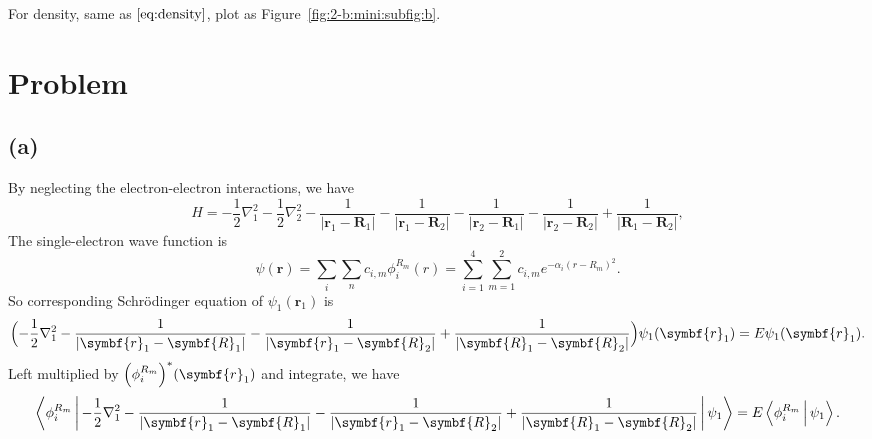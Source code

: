 
For density, same as $\eqref{eq:density}$, plot as Figure~\ref{fig:2-b:mini:subfig:b}.

\section{Problem }

\subsection*{(a)}

By neglecting the electron-electron interactions, we have
%
\begin{equation}
    H = -\frac{1}{2}\nabla_1^2 - \frac{1}{2}\nabla_2^2
    - \frac{1}{\lvert \symbf{r}_1 - \symbf{R}_1 \rvert} - \frac{1}{\lvert \symbf{r}_1 - \symbf{R}_2 \rvert}
    - \frac{1}{\lvert \symbf{r}_2 - \symbf{R}_1 \rvert} - \frac{1}{\lvert \symbf{r}_2 - \symbf{R}_2 \rvert}
    + \frac{1}{\lvert \symbf{R}_1 - \symbf{R}_2 \rvert},
\end{equation}
%
The single-electron wave function is
%
\begin{equation}
    \psi(\symbf{r}) = \sum_{i} \sum_n c_{i, m}\phi_{i}^{R_m}(r) =
    \sum_{i=1}^{4}\sum_{m=1}^{2} c_{i, m} e^{-\alpha_i (r - R_m)^2}.
\end{equation}
%
So corresponding Schrödinger equation of $\psi_1(\symbf{r}_1)$ is
%
\begin{equation}
    \Bigl(- \frac{1}{2}\nabla_1^2
    - \frac{1}{\lvert \symbf{r}_1 - \symbf{R}_1 \rvert}
    - \frac{1}{\lvert \symbf{r}_1 - \symbf{R}_2 \rvert}
    + \frac{1}{\lvert \symbf{R}_1 - \symbf{R}_2 \rvert}
    \Bigr)
    \psi_1(\symbf{r}_1) = E \psi_1 (\symbf{r}_1).
\end{equation}
%
Left multiplied by $\Bigl( \phi_i^{R_m} \Bigr)^\ast(\symbf{r}_1)$ and integrate, we have
%
\begin{equation}
    \Braket{\phi_i^{R_m} |
        - \frac{1}{2}\nabla_1^2
        - \frac{1}{\lvert \symbf{r}_1 - \symbf{R}_1 \rvert}
        - \frac{1}{\lvert \symbf{r}_1 - \symbf{R}_2 \rvert}
        + \frac{1}{\lvert \symbf{R}_1 - \symbf{R}_2 \rvert} | \psi_1}
    = E \Braket{\phi_i^{R_m} | \psi_1}.
\end{equation}

